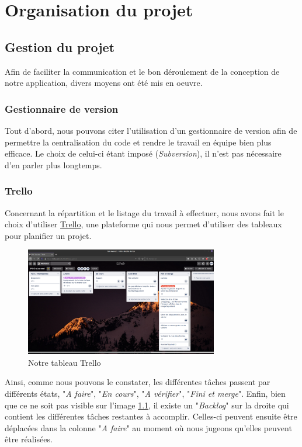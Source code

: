 \chapter{Organisation du projet}

	\section{Gestion du projet}

		Afin de faciliter la communication et le bon déroulement de la conception de notre application, divers moyens ont été mis en oeuvre.

		\subsection{Gestionnaire de version}

			Tout d'abord, nous pouvons citer l'utilisation d'un gestionnaire de version afin de permettre la centralisation du code et rendre le travail en équipe bien plus efficace. Le choix de celui-ci étant imposé (\textit{Subversion}), il n'est pas nécessaire d'en parler plus longtemps.

		\subsection{Trello}

			Concernant la répartition et le listage du travail à effectuer, nous avons fait le choix d'utiliser \href{https://trello.com}{Trello}, une plateforme qui nous permet d'utiliser des tableaux pour planifier un projet.

			\begin{figure}[H]
				\centering\includegraphics[width=0.75\textwidth, keepaspectratio]{img/trello.png}
				\caption{Notre tableau Trello}
				\label{fig:trello}
			\end{figure}

			Ainsi, comme nous pouvons le constater, les différentes tâches passent par différents états, "\textit{A faire}", "\textit{En cours}", "\textit{A vérifier}", "\textit{Fini et merge}". Enfin, bien que ce ne soit pas visible sur l'image \ref{fig:trello}, il existe un "\textit{Backlog}" sur la droite qui contient les différentes tâches restantes à accomplir. Celles-ci peuvent ensuite être déplacées dans la colonne "\textit{A faire}" au moment où nous jugeons qu'elles peuvent être réalisées.


